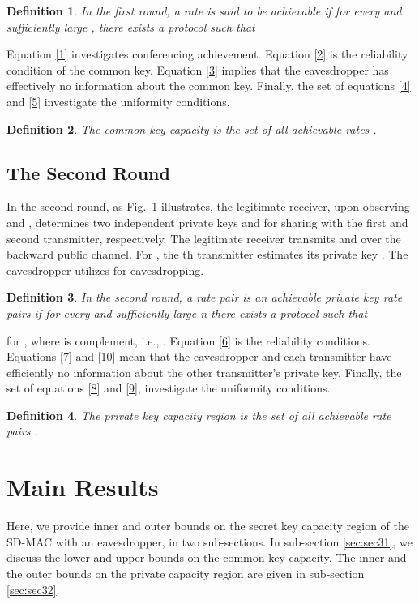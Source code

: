 \documentclass[conference,8pt]{IEEEtran}
\newtheorem{th2}{Definition}
\begin{document}
{{{\begin{th2}
In the first round, a rate  is said to be achievable if for every  and sufficiently large , there exists a protocol such that

\end{th2}
Equation \eqref{1} investigates conferencing achievement. Equation \eqref{2} is the reliability condition of the common key. Equation \eqref{3} implies that the eavesdropper has effectively no information about the common key. Finally, the set of equations \eqref{4} and \eqref{5} investigate the uniformity conditions.
\begin{th2}
The common key capacity is the set of all achievable rates .
\end{th2}
}
\subsection{The Second Round}{
In the second round, as Fig.~1 illustrates, the legitimate receiver, upon observing  and , determines two independent private keys  and  for sharing with the first and second transmitter, respectively. The legitimate receiver transmits  and  over the backward public channel. For , the th transmitter estimates its private key . The eavesdropper utilizes  for eavesdropping.

\begin{th2}
In the second round, a rate pair  is an achievable private key rate pairs if for every  and sufficiently large n there exists a protocol such that


\end{th2}for , where  is  complement, i.e., . Equation \eqref{6} is the reliability conditions. Equations \eqref{7} and \eqref{10} mean that the eavesdropper and each transmitter have efficiently no information about the other transmitter's private key. Finally, the set of equations \eqref{8} and \eqref{9}, investigate the uniformity conditions. 

\begin{th2}
The private key capacity region is the set of all achievable rate pairs .
\end{th2}
}
}
\section{Main Results}{
Here, we provide inner and outer bounds on the secret key capacity region of the SD-MAC with an eavesdropper, in two sub-sections. In sub-section \ref{sec:sec31}, we discuss the lower and upper bounds on the common key capacity. The inner and the outer bounds on the private capacity region are given in sub-section \ref{sec:sec32}. 

}}
\end{document}
